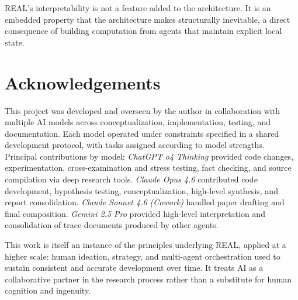 \documentclass[letterpaper]{article}
\begin{document}
REAL's interpretability is not a feature added to the architecture. It is an
embedded property that the architecture makes structurally inevitable, a direct
consequence of building computation from agents that maintain explicit local state.

\section*{Acknowledgements}

This project was developed and overseen by the author in collaboration with
multiple AI models across conceptualization, implementation, testing, and
documentation. Each model operated under constraints specified in a shared
development protocol, with tasks assigned according to model strengths. Principal
contributions by model: \textit{ChatGPT o4 Thinking} provided code changes,
experimentation, cross-examination and stress testing, fact checking, and source
compilation via deep research tools. \textit{Claude Opus 4.6} contributed code
development, hypothesis testing, conceptualization, high-level synthesis, and
report consolidation. \textit{Claude Sonnet 4.6 (Cowork)} handled paper drafting
and final composition. \textit{Gemini 2.5 Pro} provided high-level interpretation
and consolidation of trace documents produced by other agents.

This work is itself an instance of the principles underlying REAL, applied at a
higher scale: human ideation, strategy, and multi-agent orchestration used to
sustain consistent and accurate development over time. It treats AI as a
collaborative partner in the research process rather than a substitute for human
cognition and ingenuity.

\footnotesize


\end{document}
